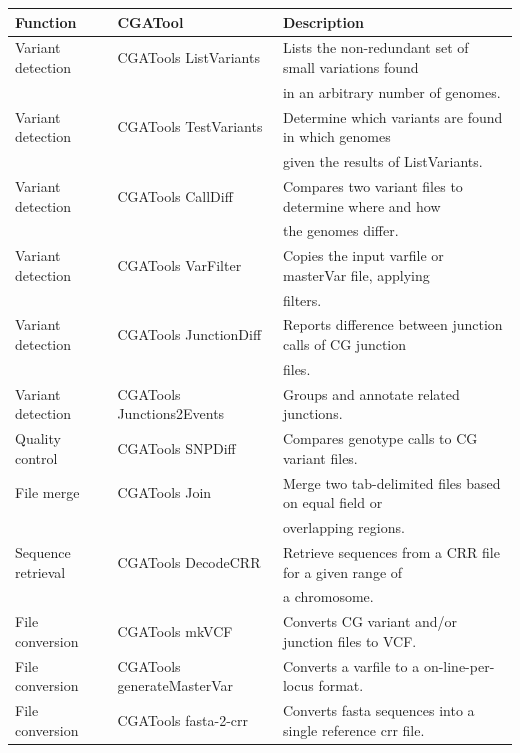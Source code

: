 \begin{table}[t!]
\small
\begin{tabular}{l|l|l}
\textbf{Function} & \textbf{CGATool}  & \textbf{Description} \\ \toprule
Variant detection & CGATools ListVariants & Lists the non-redundant set of small variations found\\
                  &                       & in an arbitrary number of genomes.\\
Variant detection & CGATools TestVariants & Determine which variants are found in which genomes\\
                  &                       & given the results of ListVariants.\\
Variant detection & CGATools CallDiff     & Compares two variant files to determine where and how\\
                  &                       & the genomes differ.\\
Variant detection & CGATools VarFilter    & Copies the input varfile or masterVar file, applying\\
                  &                       & filters. \\
Variant detection & CGATools JunctionDiff & Reports difference between junction calls of CG junction\\
                  &                       & files. \\
Variant detection & CGATools Junctions2Events & Groups and annotate related junctions.\\
Quality control   & CGATools SNPDiff      & Compares genotype calls to CG variant files.\\
File merge        & CGATools Join         & Merge two tab-delimited files based on equal field or \\
                  &                       & overlapping regions.\\
Sequence retrieval& CGATools DecodeCRR    & Retrieve sequences from a CRR file for a given range of\\
                  &                       & a chromosome.\\
File conversion   & CGATools mkVCF        & Converts CG variant and/or junction files to VCF.\\
File conversion   & CGATools generateMasterVar & Converts a varfile to a on-line-per-locus format.\\
File conversion   & CGATools fasta-2-crr  & Converts fasta sequences into a single reference crr file.\\

\end{tabular}
\end{table}
